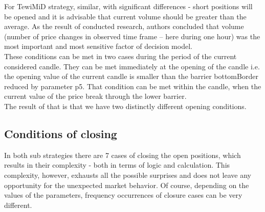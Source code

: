 \documentclass{tewiart}
\begin{document}
For TewiMiD strategy, similar, with significant differences - short positions will be opened and it is advisable that current volume should be greater  than the average. As the result of conducted research, authors concluded that volume (number of price changes in observed time frame – here during one hour) was the most important and most sensitive factor of decision model.\\

These conditions can be met in two cases during the period of the current considered candle. They can be met immediately at the opening of the candle i.e. the opening value of the current candle is smaller than the barrier bottomBorder reduced by parameter p5. That condition can be met within the candle, when the current value of the price break through the lower barrier. \\

The result of that is that we have two distinctly different opening conditions.

\subsection{Conditions of closing}
In both sub strategies there are 7 cases of closing the open positions, which results in their complexity - both in terms of logic and calculation. This complexity, however, exhausts all the possible surprises and does not  leave any opportunity for the unexpected market behavior. Of course, depending on the values of the parameters, frequency occurrences of closure cases can be very different.\\
\end{document}
